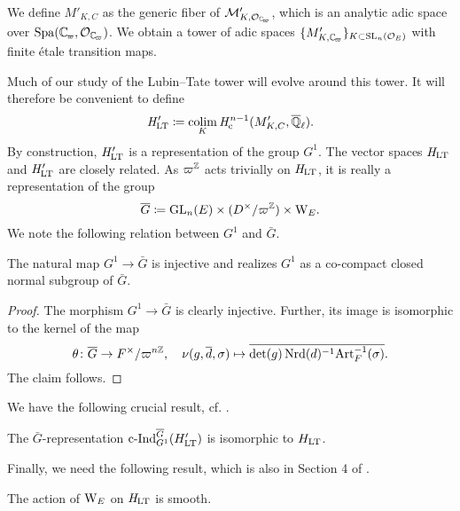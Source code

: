 \documentclass[../main.tex]{subfiles}
\begin{document}
We define $M'_{K, C}$ as the generic fiber of $\cM'_{K, \cO_\Cp}$, which is 
an analytic adic space over $\spa(\Cp,\allowbreak \cO_\Cp)$. We obtain a tower
of adic spaces
$\{M'_{K, \Cp}\}_{K \subset \SL_n(\cO_E)}$ with finite \'etale transition maps. 

Much of our study of the Lubin--Tate tower will evolve around
this tower. It will therefore be convenient to define 
\begin{equation*}
  \mathit H_{\mathrm{LT}}' \coloneqq \operatorname*{colim}_K \mathit H_{\mathrm{c}}^{n-1}(M_{K,C}', {\overline {\mathbb{Q}}_\ell}).
\end{equation*}
By construction, $\mathit H_{\mathrm{LT}}'$ is a representation of the group $G^1$. 
The vector spaces $\mathit H_{\mathrm{LT}}$ and $\mathit H_{\mathrm{LT}}'$ are closely related. 
As $\varpi^{\mathbb{Z}}$ acts trivially on $\mathit H_{\mathrm{LT}}$, it is really a representation of the group
\begin{equation*}
  \overline G \coloneqq \operatorname{GL}_n(E) \times (D^\times/\varpi^{\mathbb{Z}}) \times \mathrm W_E.
\end{equation*}
We note the following relation between $G^1$ and $\bar G$.
\begin{lem}\label{lem:G1subG}
  The natural map $G^1 \to \bar G$ is injective and realizes $G^1$ as a co-compact closed
  normal subgroup of $\bar G$.
\begin{proof}
  The morphism $G^1 \to \bar G$ is clearly injective. Further, its image is
  isomorphic to the kernel of the map 
  \begin{equation*}
   \theta \colon \overline G \to F^\times/\varpi^{n\mathbb{Z}}, \quad \nu(g, \overline d, \sigma) \mapsto 
 \overline{\det(g)\operatorname{Nrd}(d)^{-1}\mathrm{Art}_F^{-1}(\sigma)}.
  \end{equation*}
  The claim follows.
\end{proof}
\end{lem}

We have the following crucial result, cf. \cite[Section 4]{mieda2016geometric}.
\begin{prop}\label{lem:InductionStatementOnHLT}
  The $\bar G$-representation $\mathrm{c\text{-}Ind}_{G^1}^{\overline G} (H'_{\mathrm{LT}})$ is isomorphic to $H_{\mathrm{LT}}$. 
\end{prop}

Finally, we need the following result, which is also in Section 4 of
\cite{mieda2016geometric}.
\begin{lem}\label{lem:GActsSmoothlyOnHLT}
  The action of $\mathrm W_E$ on $\mathit H_{\mathrm{LT}}$ is smooth.
\end{lem}



\end{document}

